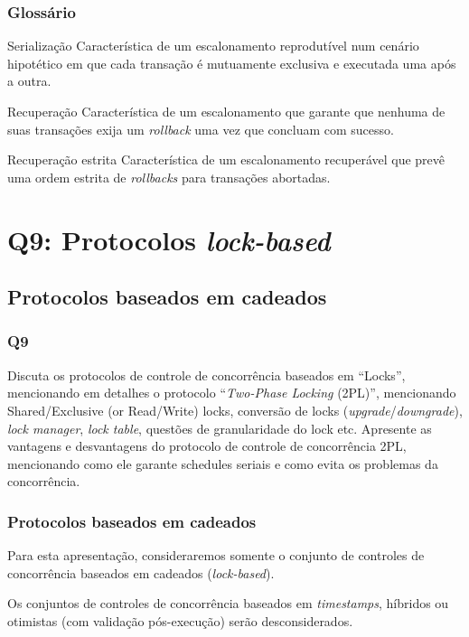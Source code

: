 \documentclass{beamer}
\begin{document}
\begin{frame} %
    \frametitle{Glossário}

    \begin{block}{Serialização}
        Característica de um escalonamento reprodutível num cenário hipotético em que cada transação é mutuamente exclusiva e executada uma após a outra.
    \end{block}
    \begin{block}{Recuperação}
        Característica de um escalonamento que garante que nenhuma de suas transações exija um \emph{rollback} uma vez que concluam com sucesso.
       \end{block}
    \begin{block}{Recuperação estrita}
        Característica de um escalonamento recuperável que prevê uma ordem estrita de \emph{rollbacks} para transações abortadas.
    \end{block}
\end{frame}

\section{Q9: Protocolos \emph{lock-based}}

\subsection{Protocolos baseados em cadeados}

\begin{frame}
    \frametitle{Q9}
    Discuta os protocolos de controle de concorrência baseados em “Locks”,
    mencionando em detalhes o protocolo “\emph{Two-Phase Locking} (2PL)”,
    mencionando Shared/Exclusive (or Read/Write) locks,
    conversão de locks (\emph{upgrade}/\emph{downgrade}), \emph{lock manager}, \emph{lock table},
    questões de granularidade do lock etc.
    Apresente as vantagens e desvantagens do protocolo de controle de concorrência 2PL,
    mencionando como ele garante schedules seriais
    e como evita os problemas da concorrência.

\end{frame}

\begin{frame} %
    \frametitle{Protocolos baseados em cadeados}

    Para esta apresentação, consideraremos somente o conjunto de controles de concorrência baseados em cadeados (\emph{lock-based}).

    \medskip

    \newblock        
    Os conjuntos de controles de concorrência baseados em \emph{timestamps}, híbridos ou otimistas (com validação pós-execução) serão desconsiderados.
\end{frame}
\end{document}
